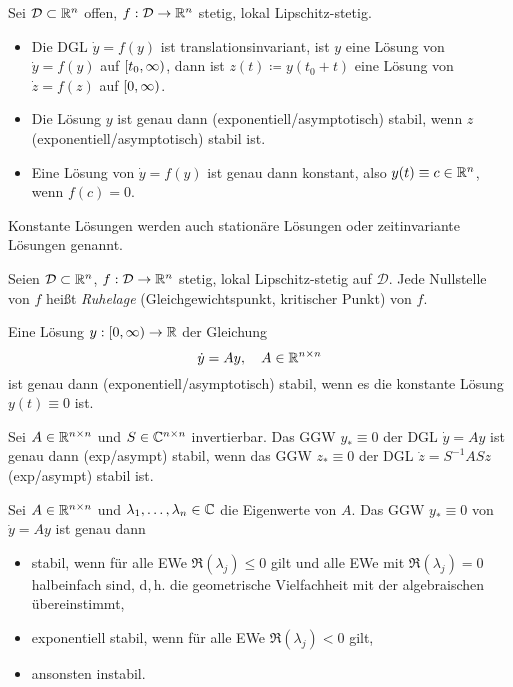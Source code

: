 \documentclass{cheat-sheet}
\newcommand{\D}{\mathcal{D}}
\begin{document}

\begin{satz}
  Sei $\D \subset \R^{n}$ offen, $f : \D \to \R^n$ stetig, lokal Lipschitz-stetig.
  \begin{itemize}
    \item Die DGL $\dot{y} = f(y)$ ist translationsinvariant, \dh{} ist $y$ eine Lösung von $\dot{y} = f(y)$ auf $\left[ t_0, \infty \right)$, dann ist $z(t) \coloneqq y(t_0 + t)$ eine Lösung von $\dot{z} = f(z)$ auf $\left[ 0, \infty \right)$.
    \item Die Lösung $y$ ist genau dann (exponentiell/asymptotisch) stabil, wenn $z$ (exponentiell/asymptotisch) stabil ist.
    \item Eine Lösung von $\dot{y} = f(y)$ ist genau dann konstant, also $y(t) \equiv c \in \mathbb{R}^n$, wenn $f(c) = 0$.
  \end{itemize}
\end{satz}

\begin{sprech}
  Konstante Lösungen werden auch stationäre Lösungen oder zeitinvariante Lösungen genannt.
\end{sprech}

\begin{defn}
  Seien $\D \subset \R^n$, $f : \D \to \R^n$ stetig, lokal Lipschitz-stetig auf $\D$. Jede Nullstelle von $f$ heißt \emph{Ruhelage} (Gleichgewichtspunkt, kritischer Punkt) von $f$.
\end{defn}


\begin{bem}
  Eine Lösung $y : \left[ 0, \infty \right) \to \mathbb{R}$ der Gleichung
  \[ \dot{y} = A y, \quad A \in \mathbb{R}^{n \times n} \]
  ist genau dann (exponentiell/asymptotisch) stabil, wenn es die konstante Lösung $y(t) \equiv 0$ ist.
\end{bem}


\begin{satz}
  Sei $A \in \mathbb{R}^{n \times n}$ und $S \in \mathbb{C}^{n \times n}$ invertierbar. Das GGW $y_* \equiv 0$ der DGL $\dot{y} = Ay$ ist genau dann (exp/asympt) stabil, wenn das GGW $z_* \equiv 0$ der DGL $\dot{z} = S^{-1} A S z$ (exp/asympt) stabil ist.
\end{satz}

\begin{satz}
  Sei $A \in \mathbb{R}^{n \times n}$ und $\lambda_1, \ldots, \lambda_n \in \mathbb{C}$ die Eigenwerte von $A$. Das GGW $y_* \equiv 0$ von $\dot{y} = Ay$ ist genau dann
  \begin{itemize}
    \item stabil, wenn für alle EWe $\Re(\lambda_j) \leq 0$ gilt und alle EWe mit $\Re(\lambda_j) = 0$ halbeinfach sind, d,\,h. die geometrische Vielfachheit mit der algebraischen übereinstimmt,
    \item exponentiell stabil, wenn für alle EWe $\Re(\lambda_j) < 0$ gilt,
    \item ansonsten instabil.
  \end{itemize}
\end{satz}
\end{document}
